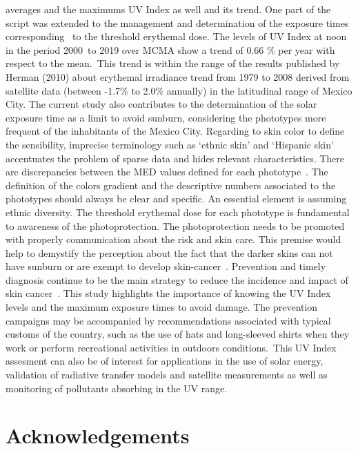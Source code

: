 \documentclass{article}
\begin{document}
averages and the maximums UV Index as well and its trend. One part of
the script was extended to the management and determination of the
exposure times corresponding~ to the threshold erythemal dose. The
levels of UV Index at noon in the period 2000~to 2019 over MCMA show a
trend of 0.66 \% per year with respect to the mean.~This trend is within
the range of the results published by Herman (2010) about erythemal
irradiance trend from 1979 to 2008 derived from satellite data (between
-1.7\% to 2.0\% annually) in the latitudinal range of Mexico City. The
current study also contributes to the determination of the solar
exposure time as a limit to avoid sunburn, considering the phototypes
more frequent of the inhabitants of the Mexico City. Regarding to skin
color to define the sensibility, imprecise terminology such as `ethnic
skin' and `Hispanic skin' accentuates the problem of sparse data and
hides relevant characteristics. There are discrepancies between the MED
values defined for each phototype~\cite{Fitzpatrick1988,Sanclemente_2008,Perez2014,Lehmann_2019,Cadet_2019}. The definition of
the colors gradient and the descriptive numbers associated to the
phototypes should always be clear and specific. An essential element is
assuming ethnic diversity. The threshold erythemal dose for each
phototype is fundamental to awareness of the photoprotection. The
photoprotection needs to be promoted with properly communication about
the risk and skin care. This premise would help to demystify the
perception about the fact that the darker skins can not have sunburn or
are exempt to develop skin-cancer~\cite{b2006}. Prevention and
timely diagnosis continue to be the main strategy to reduce the
incidence and impact of skin cancer~\cite{Pinedo_2009,a2016}. This study
highlights the importance of knowing the UV Index levels and the maximum
exposure times to avoid damage. The prevention campaigns may be
accompanied by recommendations associated with typical customs of the
country, such as the use of hats and long-sleeved shirts when they work
or perform recreational activities in outdoors conditions.~This UV Index
assesment can also be of interest for applications in the use of solar
energy, validation of radiative transfer models and satellite
measurements as well as monitoring of pollutants absorbing in the UV
range.

\section*{Acknowledgements}
\end{document}

